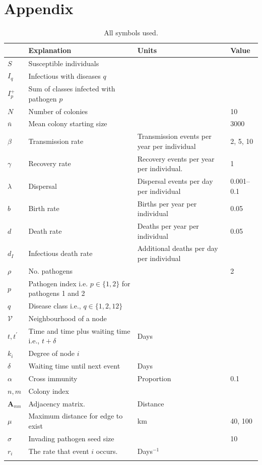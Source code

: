 \clearpage
\section{Appendix}


\begin{table}[b!]

\begin{tabular}{lp{5.7cm}p{4.3cm}l}
 & Explanation & Units&Value\\
\hline
$S$ & Susceptible individuals &&\\
$I_q$ & Infectious with diseases $q$ &&\\
$I^+_p$ & Sum of classes infected with pathogen $p$ &\\
$N$ & Number of colonies&& 10\\
$\bar{n}$ & Mean colony starting size && 3000\\
$\beta$ & Transmission rate & Transmission events per year per individual& 2, 5, 10\\
$\gamma$ & Recovery rate & Recovery events per year per individual. & 1\\
$\lambda$ & Dispersal & Dispersal events per day per individual& 0.001--0.1\\
$b$ & Birth rate & Births per year per individual& 0.05\\
$d$ & Death rate & Deaths per year per individual & 0.05\\
$d_I$ & Infectious death rate & Additional deaths per day per individual&\\
$\rho$ & No. pathogens && 2\\
$p$ &  Pathogen index i.e. $p\in\{1,2\}$ for pathogens 1 and 2 & &\\
$q$ & Disease class i.e., $q\in\{1,2,12\}$&\\
$\mathcal{V}$ & Neighbourhood of a node &&\\
$t, t^\prime$ & Time and time plus waiting time i.e., $t+\delta$ & Days&\\
$k_i$ & Degree of node $i$ &&\\
$\delta$ & Waiting time until next event & Days&\\
$\alpha$ & Cross immunity & Proportion& 0.1\\
$n, m$ & Colony index &&\\
$\bm{A}_{mn}$ & Adjacency matrix. & Distance &\\
$\mu$ & Maximum distance for edge to exist & km& 40, 100\\
$\sigma$ & Invading pathogen seed size & & 10\\
$r_i$ & The rate that event $i$ occurs. & Days$^{-1}$&\\
&&&\\
\end{tabular}
\caption{All symbols used.}
\label{t:params}
\end{table}




